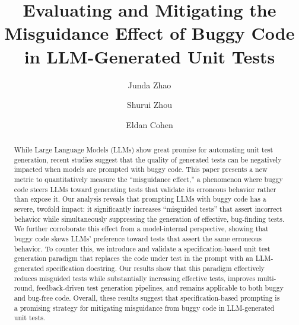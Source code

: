 \documentclass[acmsmall]{acmart}
\begin{document}
\title{Evaluating and Mitigating the Misguidance Effect of Buggy Code in LLM-Generated Unit Tests}

\author{Junda Zhao}

\author{Shurui Zhou}

\author{Eldan Cohen}


\renewcommand{\shortauthors}{Junda Zhao, Shurui Zhou, and Eldan Cohen}

\begin{abstract}
While Large Language Models (LLMs) show great promise for automating unit test generation, recent studies suggest that the quality of generated tests can be negatively impacted when models are prompted with buggy code. This paper presents a new metric to quantitatively measure the ``misguidance effect,'' a phenomenon where buggy code steers LLMs toward generating tests that validate its erroneous behavior rather than expose it. Our analysis reveals that prompting LLMs with buggy code has a severe, twofold impact: it significantly increases ``misguided tests'' that assert incorrect behavior while simultaneously suppressing the generation of effective, bug-finding tests. We further corroborate this effect from a model-internal perspective, showing that buggy code skews LLMs' preference toward tests that assert the same erroneous behavior. To counter this, we introduce and validate a specification-based unit test generation paradigm that replaces the code under test in the prompt with an LLM-generated specification docstring. Our results show that this paradigm effectively reduces misguided tests while substantially increasing effective tests, improves multi-round, feedback-driven test generation pipelines, and remains applicable to both buggy and bug-free code. Overall, these results suggest that specification-based prompting is a promising strategy for mitigating misguidance from buggy code in LLM-generated unit tests.

\end{abstract}
\end{document}
